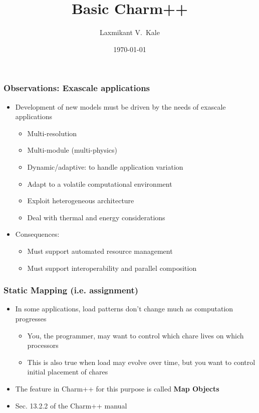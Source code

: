 \documentclass{beamer}
\title{Basic Charm++}
\author[Laxmikant V.~Kale]{
Laxmikant V.~Kale
}
\date{\today}
\begin{document}
\begin{frame}[fragile]
  \frametitle{Observations: Exascale applications}
    \begin{itemize}
    \item Development of new models must be driven by the needs of exascale
    applications
      \begin{itemize}
        \item Multi-resolution
        \item Multi-module (multi-physics)
        \item Dynamic/adaptive: to handle application variation
        \item Adapt to a volatile computational environment
        \item Exploit heterogeneous architecture
        \item Deal with thermal and energy considerations
      \end{itemize}
    \item Consequences:
      \begin{itemize}
        \item Must support automated resource management
        \item Must support interoperability and parallel composition
      \end{itemize}
    \end{itemize}
\end{frame}

\begin{frame}[fragile]
  \frametitle{Static Mapping (i.e. assignment)}
    \begin{itemize}
      \item In some applications, load patterns don’t change much as computation progresses
      \begin{itemize}
        \item You, the programmer, may want to control which chare lives on which processors
        \item This is also true when  load may evolve over time, but you want to control initial placement of chares
      \end{itemize}
      \item The feature in Charm++ for this purpose is called \textbf{Map
      Objects}
      \item Sec. 13.2.2 of the Charm++ manual
    \end{itemize}
\end{frame}
\end{document}

